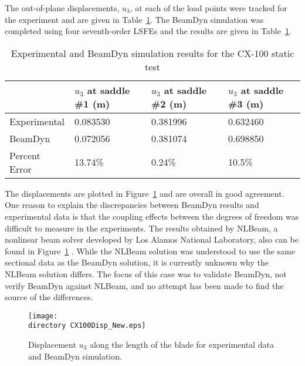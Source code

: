 \documentclass{aiaa-tc}
\def\directory{EPSF/}
\begin{document}
The out-of-plane displacements, $u_3$, at each of the load points were tracked for the experiment and are given in Table~\ref{CX100Results}. The BeamDyn simulation was completed using four seventh-order LSFEs and the results are given in Table~\ref{CX100Results}.
\begin{table}
\caption{\label{CX100Results}Experimental and BeamDyn simulation results for the CX-100 static test  } 
\begin{center}
    \begin{tabular}{| l | l | l | l |}
    	\hline
    	             & $u_3$ at saddle \#1 (m) & $u_3$ at saddle \#2 (m) & $u_3$ at saddle \#3 (m) \\ \hline
    	Experimental & 0.083530             & 0.381996               & 0.632460             \\ \hline
    	BeamDyn      & 0.072056               & 0.381074                & 0.698850           \\ \hline
    	    	Percent Error      &        13.74\%        & 0.24\%                & 10.5\%           \\ \hline
    \end{tabular}
\end{center}
\end{table} 
The displacements are plotted in Figure~\ref{CX100Disp_New} and are overall in good agreement. One reason to explain the discrepancies between BeamDyn results and experimental data is that the coupling effects between the degrees of freedom was difficult to measure in the experiments. The results obtained by NLBeam, a nonlinear beam solver developed by Los Alamos National Laboratory, also can be found in Figure~\ref{CX100Disp_New} \cite{Luscher:2013}. While the NLBeam solution was understood to use the same sectional data as the BeamDyn solution, it is currently unknown why the NLBeam solution differs.  The focus of this case was to validate BeamDyn, not verify BeamDyn against NLBeam, and no attempt has been made to find the source of the differences.

\begin{figure}
\centering
\texttt{[image: \\directory CX100Disp\_New.eps]}
\caption{Displacement $u_3$ along the length of the blade for experimental data and BeamDyn simulation.} 
\label{CX100Disp_New}
\end{figure}
\end{document}
